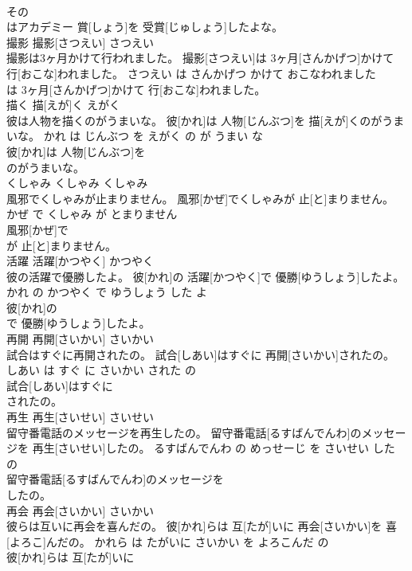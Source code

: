 \documentclass[8pt]{extreport}
\begin{document}
\begin{CJK}{UTF8}{min}
\\	その
\\	はアカデミー 賞[しょう]を 受賞[じゅしょう]したよな。			
\\	撮影	撮影[さつえい]	さつえい	
\\	撮影は3ヶ月かけて行われました。	撮影[さつえい]は 3ヶ月[さんかげつ]かけて 行[おこな]われました。	さつえい は さんかげつ かけて おこなわれました	
\\	は 3ヶ月[さんかげつ]かけて 行[おこな]われました。			
\\	描く	描[えが]く	えがく	
\\	彼は人物を描くのがうまいな。	彼[かれ]は 人物[じんぶつ]を 描[えが]くのがうまいな。	かれ は じんぶつ を えがく の が うまい な	
\\	彼[かれ]は 人物[じんぶつ]を
\\	のがうまいな。			
\\	くしゃみ	くしゃみ	くしゃみ	
\\	風邪でくしゃみが止まりません。	風邪[かぜ]でくしゃみが 止[と]まりません。	かぜ で くしゃみ が とまりません	
\\	風邪[かぜ]で
\\	が 止[と]まりません。			
\\	活躍	活躍[かつやく]	かつやく	
\\	彼の活躍で優勝したよ。	彼[かれ]の 活躍[かつやく]で 優勝[ゆうしょう]したよ。	かれ の かつやく で ゆうしょう した よ	
\\	彼[かれ]の
\\	で 優勝[ゆうしょう]したよ。			
\\	再開	再開[さいかい]	さいかい	
\\	試合はすぐに再開されたの。	試合[しあい]はすぐに 再開[さいかい]されたの。	しあい は すぐ に さいかい された の	
\\	試合[しあい]はすぐに
\\	されたの。			
\\	再生	再生[さいせい]	さいせい	
\\	留守番電話のメッセージを再生したの。	留守番電話[るすばんでんわ]のメッセージを 再生[さいせい]したの。	るすばんでんわ の めっせーじ を さいせい した の	
\\	留守番電話[るすばんでんわ]のメッセージを
\\	したの。			
\\	再会	再会[さいかい]	さいかい	
\\	彼らは互いに再会を喜んだの。	彼[かれ]らは 互[たが]いに 再会[さいかい]を 喜[よろこ]んだの。	かれら は たがいに さいかい を よろこんだ の	
\\	彼[かれ]らは 互[たが]いに

\end{CJK}
\end{document}
